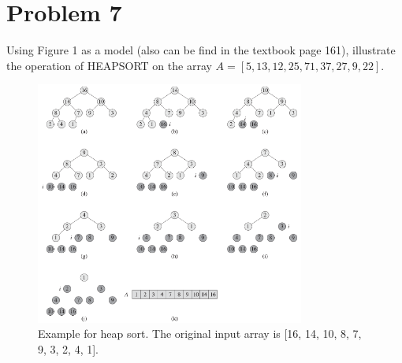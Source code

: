 \documentclass[10pt]{article}
\begin{document}
\section*{Problem 7}
Using Figure 1 as a model (also can be find in the textbook page 161), illustrate the operation of HEAPSORT on the array
$A=[5, 13, 12, 25, 71, 37, 27, 9, 22]$.
\begin{center}
  \begin{figure}[h!]
    \centering
    \includegraphics[height=8cm,keepaspectratio]{fig1.png}
    \caption{Example for heap sort. The original input array is [16, 14, 10, 8, 7,
9, 3, 2, 4, 1].}
  \end{figure}
\end{center}
\end{document}
